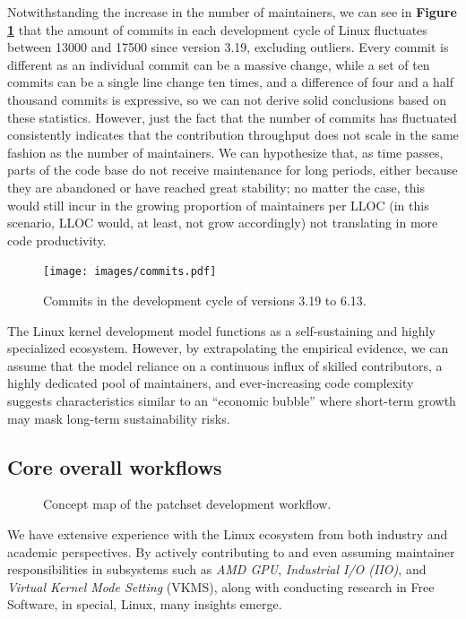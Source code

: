 \documentclass[sigconf]{acmart} %
\begin{document}
Notwithstanding the increase in the number of maintainers, we can see in
\textbf{Figure \ref{fig:commits-linux}} that the amount of commits in each
development cycle of Linux fluctuates between 13000 and 17500 since version
3.19, excluding outliers.  Every commit is different as an individual commit can
be a massive change, while a set of ten commits can be a single line change ten
times, and a difference of four and a half thousand commits is expressive, so we
can not derive solid conclusions based on these statistics. However, just the
fact that the number of commits has fluctuated consistently indicates that the
contribution throughput does not scale in the same fashion as the number of
maintainers. We can hypothesize that, as time passes, parts of the code base do
not receive maintenance for long periods, either because they are abandoned or
have reached great stability; no matter the case, this would still incur in the
growing proportion of maintainers per LLOC (in this scenario, LLOC would, at
least, not grow accordingly) not translating in more code productivity.

\begin{figure}[ht]
    \centering
    \texttt{[image: images/commits.pdf]}
    \caption{Commits in the development cycle of versions 3.19 to 6.13.\label{fig:commits-linux}}
\end{figure}

The Linux kernel development model functions as a self-sustaining and highly
specialized ecosystem. However, by extrapolating the empirical evidence, we can
assume that the model reliance on a continuous influx of skilled contributors, a
highly dedicated pool of maintainers, and ever-increasing code complexity
suggests characteristics similar to an ``economic bubble'' where short-term
growth may mask long-term sustainability risks.

\subsection{Core overall workflows}

\begin{figure}[ht]
    \centering
    \caption{Concept map of the patchset development workflow.}
    \label{fig:patchset-dev-workflow}
\end{figure}

We have extensive experience with the Linux ecosystem from both industry and
academic perspectives. By actively contributing to and even assuming maintainer
responsibilities in subsystems such as \textit{AMD GPU}, \textit{Industrial I/O
(IIO)}, and \textit{Virtual Kernel Mode Setting} (VKMS), along with conducting
research in Free Software, in special, Linux, many insights emerge. 
\end{document}
